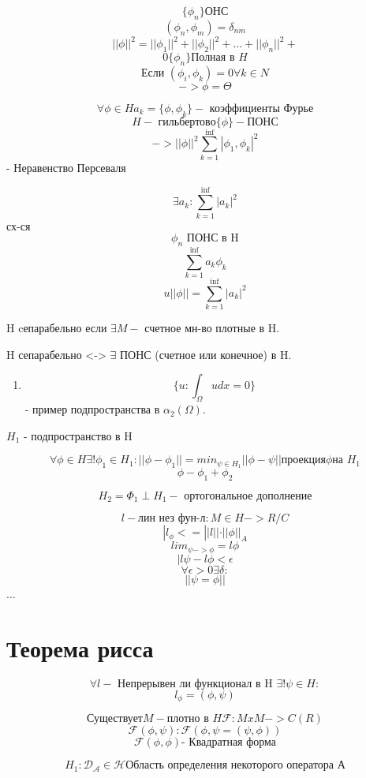 \documentclass{article}
\begin{document}
\[ \{\phi_n \} \textrm{ОНС} \]
\[ (\phi_n, \phi_m) = \delta _{nm} \]
\[ ||\phi||^2  = {||\phi_1||}^2 +{||\phi_2||}^2+ ... +{||\phi_n||}^2 +\]
\[ 0 \{ \phi_n \} \textrm{Полная в }H \]
\[ \textrm{Если } (\phi_i, \phi_k) = 0 \forall k \in N \]
\[  -> \phi = \Theta \]


\[ \forall \phi \in H a_k = \{ \phi, \phi_k \} - \textrm{ коэффициенты Фурье} \]
\[ H -\textrm{ гильбертово} \{\phi\} - \textrm{ПОНС} \]
\[ -> {|| \phi ||}^2 \sum^{\inf}_{k=1} | \phi_1, \phi_k |^2 \] - Неравенство Персеваля

\[ \exists a_k: \sum_{k=1}^{\inf} |a_k|^2 \] сх-ся
\[ {\phi_n\textrm{ ПОНС в H}} \]
\[ \sum_{k=1}^{\inf} a_k \phi_k \]
\[ u ||\phi|| = \sum_{k=1}^{\inf} {|a_k|}^2 \]

H cепарабельно если $ \exists M - $ счетное мн-во плотные в H.

H сепарабельно <-> $ \exists $ ПОНС (счетное или конечное) в H.

\begin{enumerate}
	\item \[ \{ u: \int_{\Omega}^{} u dx = 0 \} \] - пример подпространства в $ \alpha_2(\Omega) $.
\end{enumerate}

$ H_1 $ - подпространство в H

\[ \forall \phi \in H \exists ! \phi_1 \in H_1: || \phi-\phi_1 || = {min}_{\psi \in H_1} || \phi- \psi || \textrm{проекция} \phi \textrm{на } H_1 \]
\[ \phi - \phi_1 + \phi_2 \]

\[ H_2 = \Phi_1 \perp H_1 - \textrm{ ортогональное дополнение} \]

\[ l - \textrm{лин нез фун-л} : M \in H -> R/C \]
\[ |l_{\phi} <= || l || \cdot ||\phi||_A \]
\[ {lim}_{\psi -> \phi} = l\phi \]
\[ | l\psi - l\phi < \epsilon\]
\[ \forall \epsilon > 0 \exists \delta : \]
\[ || \psi = \phi ||  \]
...

\section{Теорема рисса}

\[  \forall l - \textrm{ Непрерывен ли функционал в H } \exists! \psi \in H: \]
\[ l_{\phi} = (\phi, \psi) \]


\[ \textrm{Существует} M - \textrm{плотно в } H \mathcal{F}: M x M -> C(R)  \]
\[ \mathcal{F}(\phi, \psi): \mathcal{F}(\phi, \psi = \mathcal{ (\psi, \phi)}) \]
\[ \mathcal{F}(\phi, \phi) \textrm{- Квадратная форма} \]

\[ H_1: \mathcal{D_A \in H} \textrm{Область определения некоторого оператора А}\] 
\end{document}
